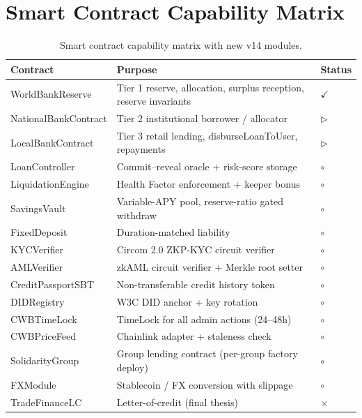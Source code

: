 \documentclass[12pt,a4paper]{report}
\newcommand{\tmarkDone}{$\checkmark$}
\newcommand{\tmarkNo}{$\times$}
\newcommand{\tmarkPartial}{$\triangleright$}
\newcommand{\tmarkPlanned}{$\circ$}
\begin{document}
\chapter{Smart Contract Capability Matrix}
\label{app:contracts}

\begin{table}[!t]
\centering
\caption{Smart contract capability matrix with new v14 modules.}
\label{tab:contracts}
\small
\begin{tabularx}{\linewidth}{@{}p{4.2cm}YR{1.6cm}@{}}
\toprule
\textbf{Contract} & \textbf{Purpose} & \textbf{Status} \\
\midrule
WorldBankReserve & Tier 1 reserve, allocation, surplus reception, reserve invariants & \tmarkDone \\
NationalBankContract & Tier 2 institutional borrower / allocator & \tmarkPartial \\
LocalBankContract & Tier 3 retail lending, disburseLoanToUser, repayments & \tmarkPartial \\
LoanController & Commit--reveal oracle + risk-score storage & \tmarkPlanned \\
LiquidationEngine & Health Factor enforcement + keeper bonus & \tmarkPlanned \\
SavingsVault & Variable-APY pool, reserve-ratio gated withdraw & \tmarkPlanned \\
FixedDeposit & Duration-matched liability & \tmarkPlanned \\
KYCVerifier & Circom 2.0 ZKP-KYC circuit verifier & \tmarkPlanned \\
AMLVerifier & zkAML circuit verifier + Merkle root setter & \tmarkPlanned \\
CreditPassportSBT & Non-transferable credit history token & \tmarkPlanned \\
DIDRegistry & W3C DID anchor + key rotation & \tmarkPlanned \\
CWBTimeLock & TimeLock for all admin actions (24--48h) & \tmarkPlanned \\
CWBPriceFeed & Chainlink adapter + staleness check & \tmarkPlanned \\
SolidarityGroup & Group lending contract (per-group factory deploy) & \tmarkPlanned \\
FXModule & Stablecoin / FX conversion with slippage & \tmarkPlanned \\
TradeFinanceLC & Letter-of-credit (final thesis) & \tmarkNo \\
\bottomrule
\end{tabularx}
\end{table}
\end{document}
